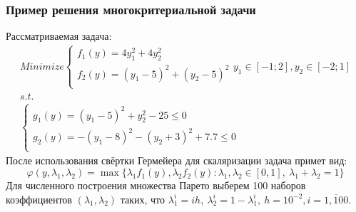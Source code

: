 \documentclass[aspectratio=1610]{beamer}
\begin{document}
\begin{frame}
  \frametitle{Пример решения многокритериальной задачи}
  Рассматриваемая задача:
  \begin{displaymath}
    \begin{array}{l}
        Minimize \left \{
        \begin{array}{l}
          f_1(y) = 4 y_1^2 + 4 y_2^2 \\
          f_2(y) = (y_1-5)^2 + (y_2-5)^2 \\
        \end{array}
        \right .
        y_1\in [-1;2],y_2\in [-2;1]
        \\s.t.
        \\
        \left \{
        \begin{array}{l}
          g_1(y) = (y_1 - 5)^2 + y_2^2 - 25 \leqslant 0 \\
          g_2(y) = -(y_1 - 8)^2 - (y_2 + 3)^2 + 7.7 \leqslant 0\\
        \end{array}
        \right .
    \end{array}
  \end{displaymath}
  После использования свёртки Гермейера для скаляризации задача примет вид:
  \begin{displaymath}
    \varphi(y,\lambda_1,\lambda_2)=\max\{\lambda_1 f_1(y), \lambda_2 f_2(y):\lambda_1,\lambda_2\in[0,1],\: \lambda_1+\lambda_2=1\}
\end{displaymath}
Для численного построения множества Парето выберем
100 наборов коэффициентов \((\lambda_1,\lambda_2)\) таких, что
\(\lambda_1^i=i h,\: \lambda_2^i=1-\lambda_1^i,\: h=10^{-2},i=\overline{1, 100}\).
\end{frame}
\end{document}
